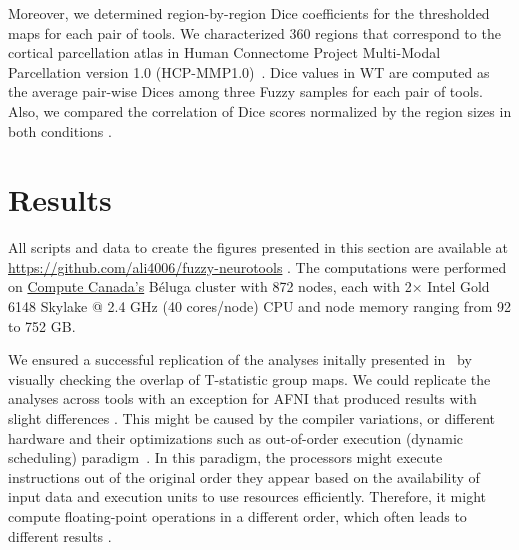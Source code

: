 \documentclass[conference]{IEEEtran}
\begin{document}
Moreover, we determined region-by-region Dice coefficients for the thresholded maps for each pair of tools.
We characterized 360 regions that correspond to the cortical parcellation atlas
in Human Connectome Project Multi-Modal Parcellation version 1.0 (HCP-MMP1.0)~\cite{glasser2016multi}.
Dice values in WT are computed as the average pair-wise Dices among three Fuzzy samples for each pair of tools.
Also, we compared the correlation of Dice scores normalized by the region sizes in both conditions .



\section{Results}
All scripts and data to create the figures presented in this section are available at \url{https://github.com/ali4006/fuzzy-neurotools} .
The computations were performed on \href{https://www.computecanada.ca}{Compute Canada's} Béluga cluster
with 872 nodes, each with 2× Intel Gold 6148 Skylake @ 2.4 GHz (40 cores/node) CPU and node memory ranging from 92 to 752 GB.

We ensured a successful replication of the analyses initally presented in~\cite{bowring2019exploring}
by visually checking the overlap  of T-statistic group maps.
We could replicate the analyses across tools with an exception for AFNI that produced results with slight differences . 
This might be caused by the compiler variations, or different hardware and their optimizations
such as out-of-order execution (dynamic scheduling) paradigm~\cite{duben2014use,demmel2013numerical}.
In this paradigm, the processors might execute instructions out of the original order they appear based on
the availability of input data and execution units to use resources efficiently. Therefore, it might
compute floating-point operations in a different order, which often leads to different results .
\end{document}

